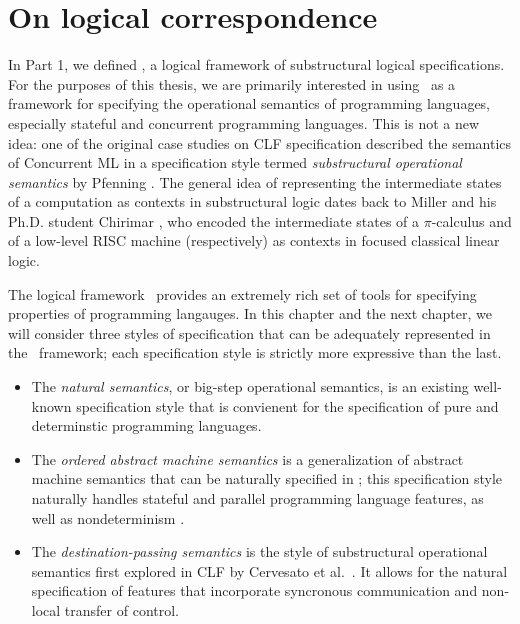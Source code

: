 \chapter{On logical correspondence}

In Part 1, we defined \sls, a logical framework of substructural
logical specifications. For the purposes of this thesis, we are
primarily interested in using \sls~as a framework for specifying the
operational semantics of programming languages, especially stateful
and concurrent programming languages. This is not a new idea: one of
the original case studies on CLF specification described the semantics
of Concurrent ML \cite{cervesato02concurrent} in a specification style
termed {\it substructural operational semantics} by Pfenning
\cite{pfenning04substructural}. The general idea of representing the
intermediate states of a computation as contexts in substructural
logic dates back to Miller \cite{miller92pi} and his Ph.D. student
Chirimar \cite{chirimar95proof}, who encoded the intermediate states
of a $\pi$-calculus and of a low-level RISC machine (respectively) as
contexts in focused classical linear logic.

The logical framework \sls~provides an extremely rich set
of tools for specifying properties of programming langauges. In this
chapter and the next chapter, we will consider three styles of
specification that can be adequately represented in the
\sls~framework; each specification style is strictly more expressive
than the last.

\begin{itemize}
\item The {\it natural semantics}, or big-step operational semantics,
  is an existing well-known specification style that is convienent for
  the specification of pure and determinstic programming
  languages. 

\item The {\it ordered abstract machine semantics} is a generalization
  of abstract machine semantics that can be naturally specified in
  \sls; this specification style naturally handles stateful and
  parallel programming language features, as well as nondeterminism
  \cite{pfenning09substructural}.

\item The {\it destination-passing semantics} is the style of
  substructural operational semantics first explored in CLF by
  Cervesato et al.~\cite{cervesato02concurrent}. It allows for the
  natural specification of features that incorporate syncronous
  communication and non-local transfer of control.
\end{itemize}

